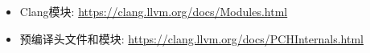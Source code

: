 \begin{itemize}
\item
Clang模块: \url{https://clang.llvm.org/docs/Modules.html}

\item
预编译头文件和模块: \url{https://clang.llvm.org/docs/PCHInternals.html}
\end{itemize}